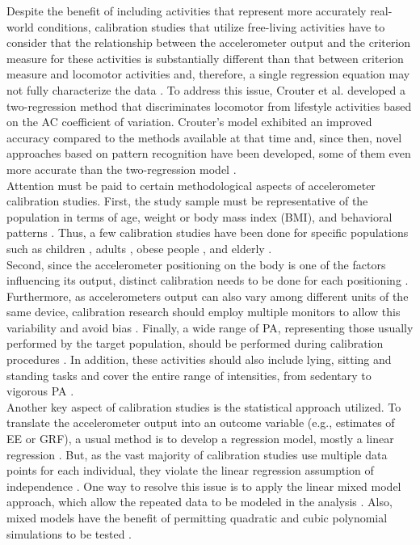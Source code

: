 \documentclass[11pt]{article}
\begin{document}
Despite the benefit of including activities that represent more accurately real-world conditions, calibration studies that utilize free-living activities have to consider that the relationship between the accelerometer output and the criterion measure for these activities is substantially different than that between criterion measure and locomotor activities and, therefore, a single regression equation may not fully characterize the data \cite{Welk_2005}. To address this issue, Crouter et al. \citeyear{Crouter_2006} developed a two-regression method that discriminates locomotor from lifestyle activities based on the AC coefficient of variation. Crouter's model exhibited an improved accuracy compared to the methods available at that time and, since then, novel approaches based on pattern recognition have been developed, some of them even more accurate than the two-regression model \cite{Farrahi_2019, Basset_2012}. \\

Attention must be paid to certain methodological aspects of accelerometer calibration studies. First, the study sample must be representative of the population in terms of age, weight or body mass index (BMI), and behavioral patterns \cite{Welk_2005, Strath_2012}. Thus, a few calibration studies have been done for specific populations such as children \cite{Phillips_2013, McMurray_2016}, adults \cite{Freedson_1998, Hibbing_2018}, obese people \cite{Aadland_2012}, and elderly \cite{Evenson_2015}. \\

Second, since the accelerometer positioning on the body is one of the factors influencing its output, distinct calibration needs to be done for each positioning \cite{Welk_2005}. Furthermore, as accelerometers output can also vary among different units of the same device, calibration research should employ multiple monitors to allow this variability and avoid bias \cite{Welk_2005}. Finally, a wide range of PA, representing those usually performed by the target population, should be performed during calibration procedures \cite{Welk_2005, Basset_2012}. In addition, these activities should also include lying, sitting and standing tasks and cover the entire range of intensities, from sedentary to vigorous PA \cite{Basset_2012}. \\

Another key aspect of calibration studies is the statistical approach utilized. To translate the accelerometer output into an outcome variable (e.g., estimates of EE or GRF), a usual method is to develop a regression model, mostly a linear regression \cite{Montoye_2017}. But, as the vast majority of calibration studies use multiple data points for each individual, they violate the linear regression assumption of independence \cite{Welk_2005, Field_2012}. One way to resolve this issue is to apply the linear mixed model approach, which allow the repeated data to be modeled in the analysis \cite{Field_2012}. Also, mixed models have the benefit of permitting quadratic and cubic polynomial simulations to be tested \cite{Field_2012}. \\
\end{document}
